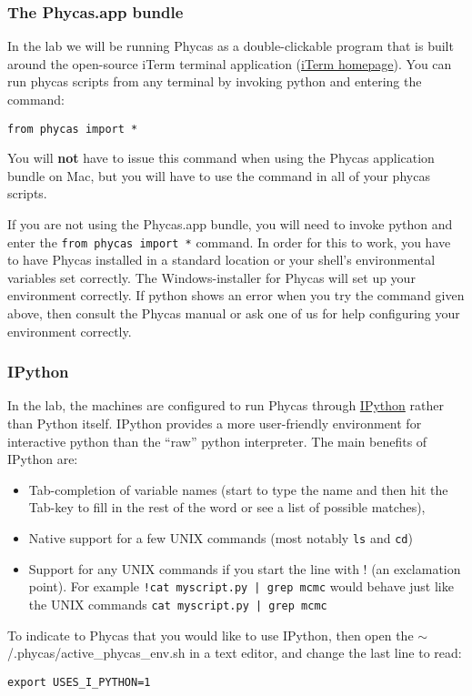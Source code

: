 \documentclass{article}
\newcommand{\cmd}[1]{\texttt{#1}\xspace}
\newcommand{\phycas}{Phycas\xspace}
\newcommand{\localfile}[1]{\textsf{#1}\xspace}
\begin{document}
\subsubsection{The Phycas.app bundle}
In the lab we will be running \phycas as a double-clickable program that is built around the open-source iTerm terminal application (\href{http://iterm.sourceforge.net/}{iTerm homepage}).
You can run phycas scripts from any terminal by invoking python and entering the command:
\begin{verbatim}
from phycas import *
\end{verbatim}
You will {\bf not} have to issue this command when using the \phycas application bundle on Mac, but you will have to use the command in all of your phycas scripts.

If you are not using the Phycas.app bundle, you will need to invoke python and enter the \cmd{from phycas import *} command.
In order for this to work, you have to have \phycas installed in a standard location or your shell's environmental variables set correctly.
The Windows-installer for \phycas will set up your environment correctly.
If python shows an error when you try the command given above, then consult the \phycas manual or ask one
of us for help configuring your environment correctly.

\subsubsection{IPython}
In the lab, the machines are configured to run \phycas through \href{http://ipython.scipy.org/moin/}{IPython} rather than Python itself.  
IPython provides a more user-friendly environment for interactive python than the ``raw'' python interpreter.
The main benefits of IPython are:
\begin{itemize}
	\item Tab-completion of variable names (start to type the name and then hit the Tab-key to fill in the rest of the word or see a list of possible matches),
	\item Native support for a few UNIX commands (most notably \cmd{ls} and \cmd{cd})
	\item Support for any UNIX commands if you start the line with ! (an exclamation point). For example \cmd{!cat myscript.py | grep mcmc} would behave just like the UNIX commands \cmd{cat myscript.py | grep mcmc}
\end{itemize}
To indicate to \phycas that you would like to use IPython, then open the \localfile{$\sim$/.phycas/active\_phycas\_env.sh} 
in a text editor, and change the last line to read:
\begin{verbatim}
export USES_I_PYTHON=1
\end{verbatim}
 
\end{document}
